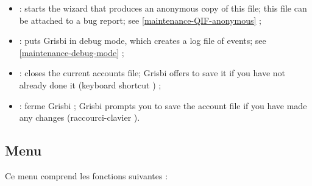 \begin{itemize}
	\item {} :  starts the wizard that produces an anonymous copy of this file; this file can be attached to a bug report; see \vref{maintenance-QIF-anonymous} ;	
	\item {} : puts Grisbi in debug mode, which creates a log file of events; see \vref{maintenance-debug-mode} ; 	
	\item {} : closes the current accounts file; Grisbi offers to save it if you have not already done it (keyboard shortcut ) ;
	\item {} : ferme Grisbi ; Grisbi prompts you to save the account file if you have made any changes (raccourci-clavier ).
\end{itemize}


\subsection{Menu \label{home-menus-edit}}

Ce menu comprend les fonctions suivantes :


